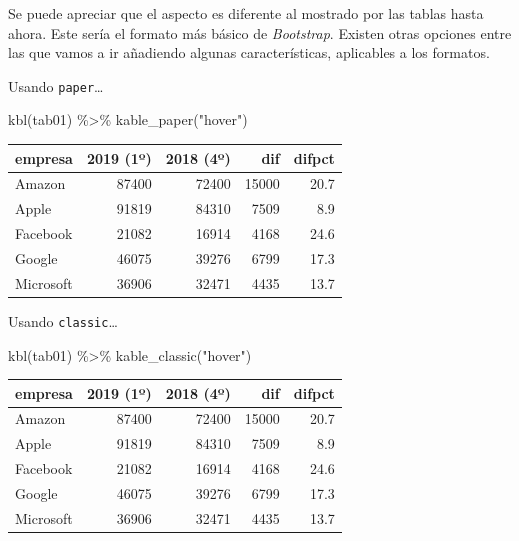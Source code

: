 \documentclass[
]{book}
\newenvironment{Shaded}{\begin{snugshade}}{\end{snugshade}}
\newcommand{\FunctionTok}[1]{\textcolor[rgb]{0.00,0.00,0.00}{#1}}
\newcommand{\NormalTok}[1]{#1}
\newcommand{\SpecialCharTok}[1]{\textcolor[rgb]{0.00,0.00,0.00}{#1}}
\newcommand{\StringTok}[1]{\textcolor[rgb]{0.31,0.60,0.02}{#1}}
\begin{document}
Se puede apreciar que el aspecto es diferente al mostrado por las tablas hasta ahora. Este sería el formato más básico de \emph{Bootstrap}. Existen otras opciones entre las que vamos a ir añadiendo algunas características, aplicables a los formatos.

Usando \texttt{paper}\ldots{}

\begin{Shaded}
\begin{Highlighting}[]
\FunctionTok{kbl}\NormalTok{(tab01) }\SpecialCharTok{\%\textgreater{}\%}
  \FunctionTok{kable\_paper}\NormalTok{(}\StringTok{"hover"}\NormalTok{)}
\end{Highlighting}
\end{Shaded}

\begin{table}
\centering
\begin{tabular}[t]{l|r|r|r|r}
\hline
empresa & 2019 (1º) & 2018 (4º) & dif & difpct\\
\hline
Amazon & 87400 & 72400 & 15000 & 20.7\\
\hline
Apple & 91819 & 84310 & 7509 & 8.9\\
\hline
Facebook & 21082 & 16914 & 4168 & 24.6\\
\hline
Google & 46075 & 39276 & 6799 & 17.3\\
\hline
Microsoft & 36906 & 32471 & 4435 & 13.7\\
\hline
\end{tabular}
\end{table}

Usando \texttt{classic}\ldots{}

\begin{Shaded}
\begin{Highlighting}[]
\FunctionTok{kbl}\NormalTok{(tab01) }\SpecialCharTok{\%\textgreater{}\%}
  \FunctionTok{kable\_classic}\NormalTok{(}\StringTok{"hover"}\NormalTok{)}
\end{Highlighting}
\end{Shaded}

\begin{table}
\centering
\begin{tabular}[t]{l|r|r|r|r}
\hline
empresa & 2019 (1º) & 2018 (4º) & dif & difpct\\
\hline
Amazon & 87400 & 72400 & 15000 & 20.7\\
\hline
Apple & 91819 & 84310 & 7509 & 8.9\\
\hline
Facebook & 21082 & 16914 & 4168 & 24.6\\
\hline
Google & 46075 & 39276 & 6799 & 17.3\\
\hline
Microsoft & 36906 & 32471 & 4435 & 13.7\\
\hline
\end{tabular}
\end{table}
\end{document}
